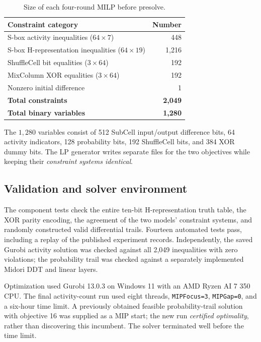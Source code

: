 \documentclass[11pt,a4paper]{article}
\begin{document}
\begin{table}[H]
 \centering
 \caption{Size of each four-round MILP before presolve.}
 \begin{tabular}{lr}
 \toprule
 Constraint category & Number\\
 \midrule
 S-box activity inequalities ($64\times7$) & 448\\
 S-box H-representation inequalities ($64\times19$) & 1,216\\
 ShuffleCell bit equalities ($3\times64$) & 192\\
 MixColumn XOR equalities ($3\times64$) & 192\\
 Nonzero initial difference & 1\\
 \midrule
 \textbf{Total constraints} & \textbf{2,049}\\
 \textbf{Total binary variables} & \textbf{1,280}\\
 \bottomrule
 \end{tabular}
\end{table}
The $1,280$ variables consist of 512 SubCell input/output difference bits,
64 activity indicators, 128 probability bits, 192 ShuffleCell bits, and
384 XOR dummy bits. The LP generator writes separate files for the two
objectives while keeping their \emph{constraint systems identical}.

\subsection{Validation and solver environment}
The component tests check the entire ten-bit H-representation truth table,
the XOR parity encoding, the agreement of the two models' constraint systems,
and randomly constructed valid differential trails. Fourteen automated tests
pass, including a replay of the published experiment records. Independently, the saved Gurobi activity solution was checked against
all 2,049 inequalities with zero violations; the probability trail was checked
against a separately implemented Midori DDT and linear layers.

Optimization used Gurobi 13.0.3 on Windows 11 with an AMD Ryzen AI 7 350 CPU.
The final activity-count run used eight threads, \texttt{MIPFocus=3},
\texttt{MIPGap=0}, and a six-hour time limit. A previously obtained feasible
probability-trail solution with objective 16 was supplied as a MIP start; the
new run \emph{certified optimality}, rather than discovering this incumbent. The solver terminated
well before the time limit.
\end{document}
